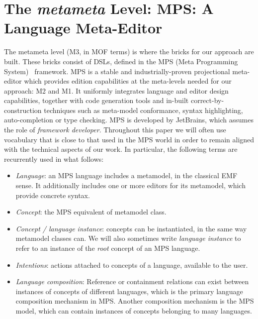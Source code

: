 \section{The \emph{metameta} Level: MPS: A Language Meta-Editor}
\label{sec:metameta}
\vspace{-.3cm}
The metameta level (M3, in MOF terms) is where the bricks for our approach are
built. These bricks consist of DSLs, defined in the MPS (Meta Programming
System)~\cite{mps} framework. MPS is a stable and industrially-proven
projectional meta-editor which provides edition capabilities at the meta-levels
needed for our approach: M2 and M1. It uniformly integrates language and editor
design capabilities, together with code generation tools and in-built
correct-by-construction techniques such as meta-model conformance, syntax
highlighting, auto-completion or type checking.
MPS is developed by JetBrains, which assumes the role of \emph{framework
developer}.
Throughout this paper we will often use vocabulary that is close to that used in
the MPS world in order to remain aligned with the technical aspects of our
work. In particular, the following terms are recurrently used in what follows:
\vspace{-.3cm}
\begin{itemize}
  \item \emph{Language}: an MPS language includes a metamodel, in the classical
  EMF sense. It additionally includes one or more editors for its metamodel,
  which provide concrete syntax.
  \item \emph{Concept}: the MPS equivalent of metamodel class.
  \item \emph{Concept / language instance}: concepts can be instantiated, in
  the same way metamodel classes can. We will also sometimes write
  \emph{language instance} to refer to an instance of the \emph{root} concept of
  an MPS language.
  \item \emph{Intentions}: actions attached to
  concepts of a language, available to the user. 
  \item \emph{Language composition}:  Reference or containment relations can exist between instances of
  concepts of different languages, which is the primary language composition
  mechanism in MPS.
 Another composition mechanism is the MPS model, which can contain instances of
 concepts belonging to many languages.
\end{itemize}
\vspace{-.7cm}
